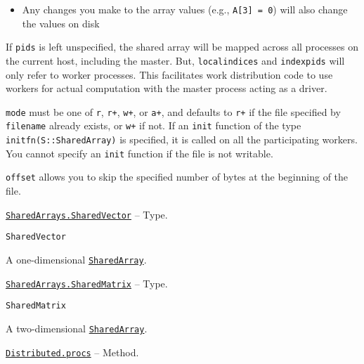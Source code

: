 \begin{adjustwidth}{2em}{0pt}
\begin{itemize}
\item Any changes you make to the array values (e.g., \texttt{A[3] = 0}) will also change the values on disk

\end{itemize}
If \texttt{pids} is left unspecified, the shared array will be mapped across all processes on the current host, including the master. But, \texttt{localindices} and \texttt{indexpids} will only refer to worker processes. This facilitates work distribution code to use workers for actual computation with the master process acting as a driver.

\texttt{mode} must be one of \texttt{{\textquotedbl}r{\textquotedbl}}, \texttt{{\textquotedbl}r+{\textquotedbl}}, \texttt{{\textquotedbl}w+{\textquotedbl}}, or \texttt{{\textquotedbl}a+{\textquotedbl}}, and defaults to \texttt{{\textquotedbl}r+{\textquotedbl}} if the file specified by \texttt{filename} already exists, or \texttt{{\textquotedbl}w+{\textquotedbl}} if not. If an \texttt{init} function of the type \texttt{initfn(S::SharedArray)} is specified, it is called on all the participating workers. You cannot specify an \texttt{init} function if the file is not writable.

\texttt{offset} allows you to skip the specified number of bytes at the beginning of the file.



\end{adjustwidth}
\hypertarget{7409079308721392752}{} 
\hyperlink{7409079308721392752}{\texttt{SharedArrays.SharedVector}}  -- {Type.}

\begin{adjustwidth}{2em}{0pt}


\begin{verbatim}
SharedVector
\end{verbatim}

A one-dimensional \hyperlink{15069300442338861576}{\texttt{SharedArray}}.



\end{adjustwidth}
\hypertarget{4014464484316382916}{} 
\hyperlink{4014464484316382916}{\texttt{SharedArrays.SharedMatrix}}  -- {Type.}

\begin{adjustwidth}{2em}{0pt}


\begin{verbatim}
SharedMatrix
\end{verbatim}

A two-dimensional \hyperlink{15069300442338861576}{\texttt{SharedArray}}.



\end{adjustwidth}
\hypertarget{379512234313781053}{} 
\hyperlink{379512234313781053}{\texttt{Distributed.procs}}  -- {Method.}

